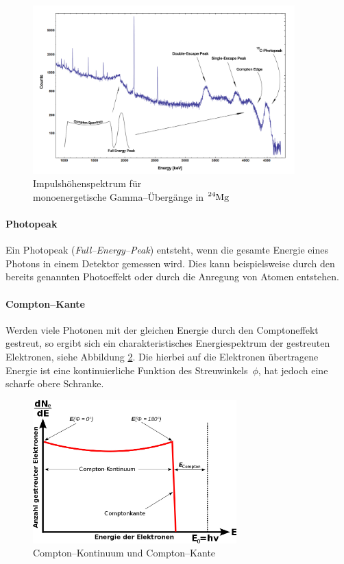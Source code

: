 \documentclass[12pt,a4paper]{scrartcl}
\numberwithin{equation}{section} %
\begin{document}
\begin{figure}[h]
	\centering
	\includegraphics[width=0.9\textwidth]{../media/B3.4/Am_Be_SourceSpectrum.jpg}
	\caption{Impulshöhenspektrum für \\
		monoenergetische Gamma--Übergänge in $\ce{^{24}Mg}$  \cite{abb:Spektrum}}
	\label{abb:Impulshoehenspektrum}
\end{figure}

\paragraph{Photopeak}

Ein Photopeak (\emph{Full--Energy--Peak}) entsteht, wenn die gesamte Energie eines Photons in einem Detektor gemessen wird. Dies kann beispielsweise durch den bereits genannten Photoeffekt oder durch die Anregung von Atomen entstehen.

\paragraph{Compton--Kante}

Werden viele Photonen mit der gleichen Energie durch den Comptoneffekt gestreut, so ergibt sich ein charakteristisches Energiespektrum der gestreuten Elektronen, siehe Abbildung \ref{abb:Compton-Kante}. Die hierbei auf die Elektronen übertragene Energie ist eine kontinuierliche Funktion des Streuwinkels~$\phi$, hat jedoch eine scharfe obere Schranke.

\begin{figure}[h]
	\centering
	\includegraphics[width=0.7\textwidth]{../media/B3.4/Comptonspektrum.jpg}
	\caption{Compton--Kontinuum und Compton--Kante \cite{abb:Compton}}
	\label{abb:Compton-Kante}
\end{figure}
\end{document}
